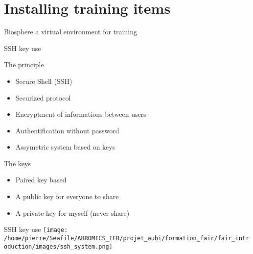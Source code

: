 \section{Installing training items}

\begin{frame}{Biosphere a virtual environment for training}

\end{frame}

\begin{frame}[fragile]{SSH key use}

\begin{block}{The principle}
\begin{itemize}
\item Secure Shell (SSH)
\item Securized protocol
\item Encryptment of informations between users
\item Authentification without password
\item Assymetric system based on keys
\end{itemize}
\end{block}

\begin{block}{The keys}
\begin{itemize}
\item Paired key based
\item A public key for everyone to share
\item A private key for myself (never share)
\end{itemize}
\end{block}

\end{frame}

\begin{frame}{SSH key use}
\centering\texttt{[image: /home/pierre/Seafile/ABROMICS\_IFB/projet\_aubi/formation\_fair/fair\_introduction/images/ssh\_system.png]}
\end{frame}

